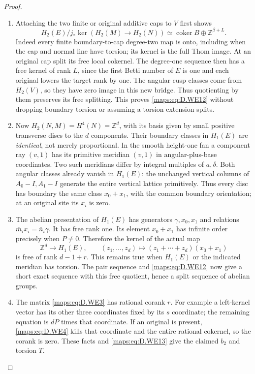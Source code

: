 \begin{proof}
\begin{enumerate}[label=\arabic*.,leftmargin=*]
\item Attaching the two finite or original additive caps
to $V$ first shows
\[
 H_2(E)/j_*\ker(H_2(M)\to H_2(N))
 \simeq\operatorname{coker}B\oplus\mathbb Z^{\beta+L}.
                                                               \tag{D.WE12}\label{maps:eq:D.WE12}
\]
Indeed every finite boundary-to-cap degree-two map
is onto, including when the cap and normal line
have torsion; its kernel is the full Thom image.
At an original cap split its free local cokernel.
The degree-one sequence then has a free kernel of
rank $L$, since the first Betti number of $E$ is
one and each original lowers the target rank by one.
The angular cusp classes come from $H_2(V)$, so
they have zero image in this new bridge. Thus
quotienting by them preserves its free splitting.
This proves \eqref{maps:eq:D.WE12} without dropping boundary
torsion or assuming a torsion extension splits.

\item Now $H_2(N,M)=H^4(N)=\mathbb Z^d$, with its basis
given by small positive transverse discs to the
$d$ components. Their boundary classes in $H_1(E)$
are \emph{identical}, not merely proportional.
In the smooth height-one fan a component ray
$(v,1)$ has its primitive meridian $(v,1)$ in
angular-plus-base coordinates. Two such meridians
differ by integral multiples of $a,\delta$.
Both angular classes already vanish in $H_1(E)$:
the unchanged vertical columns of $A_0-I,A_1-I$
generate the entire vertical lattice primitively.
Thus every disc has boundary the same class
$x_0+x_1$, with the common boundary orientation;
at an original site its $x_i$ is zero.

\item The abelian presentation of $H_1(E)$ has generators
$\gamma,x_0,x_1$ and relations
$\overline m_i x_i=\overline n_i\gamma$.
It has free rank one. Its element $x_0+x_1$ has
infinite order precisely when $P\ne0$.
Therefore the kernel of the actual map
\[
 \mathbb Z^d\longrightarrow H_1(E),\qquad
 (z_1,\ldots,z_d)\longmapsto
                 (z_1+\cdots+z_d)(x_0+x_1)
                                                               \tag{D.WE13}\label{maps:eq:D.WE13}
\]
is free of rank $d-1+r$. This remains true when
$H_1(E)$ or the indicated meridian has torsion.
The pair sequence and \eqref{maps:eq:D.WE12} now give a short
exact sequence with this free quotient, hence a
split sequence of abelian groups.

\item The matrix \eqref{maps:eq:D.WE3} has rational corank $r$.
For example a left-kernel vector has its other
three coordinates fixed by its $s$ coordinate;
the remaining equation is $dP$ times that coordinate.
If an original is present, \eqref{maps:eq:D.WE4} kills that
coordinate and the entire rational cokernel, so
the corank is zero. These facts and \eqref{maps:eq:D.WE13} give
the claimed $b_2$ and torsion $T$.


\end{enumerate}
\end{proof}

